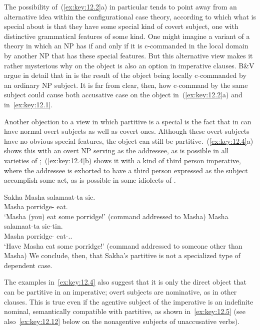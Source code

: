 \documentclass[output=paper]{langsci/langscibook}
\begin{document}
The possibility of~(\ref{ex:key:12.2}a) in particular tends to point away from
an alternative idea within the configurational case theory, according to which
what is special about  is that they have some special kind of covert
subject, one with distinctive grammatical features of some kind. One might
imagine a variant of a  theory \citep{Marantz1991} in which
an NP has  if and only if it is c-commanded in the local domain
by another NP that has these special features. But this alternative view makes
it rather mysterious why  on the object is also an option in
imperative clauses. B\&V argue in detail that  in  is
the result of the object being locally c-commanded by an ordinary NP subject.
It is far from clear, then, how c-command by the same subject could cause both
accusative case on the object in~(\ref{ex:key:12.2}a) and 
in~\eqref{ex:key:12.1}.

Another objection to a view in which partitive is a special  is the fact that  in  can have normal overt
subjects as well as covert ones. Although these overt subjects have no obvious
special features, the object can still be partitive.~(\ref{ex:key:12.4}a) shows
this with an overt NP serving as the addressee, as is possible in all varieties
of ;~(\ref{ex:key:12.4}b) shows it with a kind of third person
imperative, where the addressee is exhorted to have a third person expressed as
the subject accomplish some act, as is possible in some idiolects of
 \citep{Zanuttini2008}.

\ea\label{ex:key:12.4}Sakha
	\ea
		\gll Masha  salamaat-ta sie.\\
			Masha  porridge-\Part{}  eat.\Imp{}\\
		\glt ‘Masha (you) eat some porridge!’ (command addressed to Masha)
	\ex
		\gll Masha  salamaat-ta sie-tin.\\
			Masha  porridge-\Part{}  eat-\Imp{}.\Tsg.\Sbj{}\\
		\glt ‘Have Masha eat some porridge!’ (command addressed to someone other than Masha)
	\z
\z
We conclude, then, that Sakha’s partitive is not a specialized type of
dependent case.

The examples in~\eqref{ex:key:12.4} also suggest that it is only the direct
object that can be partitive in an imperative; overt subjects are nominative,
as in other clauses.  This is true even if the agentive subject of the
imperative is an indefinite nominal, semantically compatible with partitive, as
shown in~\eqref{ex:key:12.5} (see also~\eqref{ex:key:12.12} below on the
nonagentive subjects of unaccusative verbs).
\end{document}
